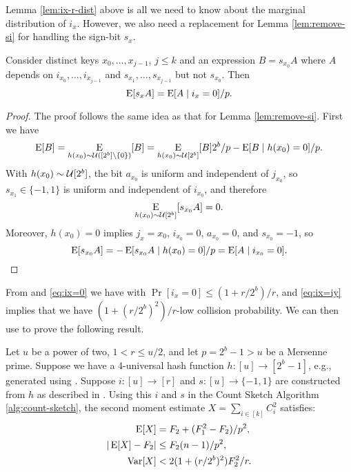 Lemma \ref{lem:ix-r-dist} above is all we need to know about the
marginal distribution of $i_x$. However, we also need a replacement
for Lemma \ref{lem:remove-si} for handling the sign-bit $s_x$.
\begin{lemma}\label{lem:remove-si-r-dist} Consider distinct keys
   $x_0,\ldots,x_{j - 1}$, $j\leq k$ and an expression $B=s_{x_0}A$ where $A$
   depends on $i_{x_0},\ldots,i_{x_{j - 1}}$ and $s_{x_1},\ldots,s_{x_{j - 1}}$ but not
   $s_{x_0}$. 
   Then
   \begin{equation}\label{eq:remove-si-r-dist}
      \operatorname*{E}[s_xA]=\operatorname*{E}[A \mid i_x=0]/p.
   \end{equation}
\end{lemma}
\begin{proof}
   The proof follows the same idea as that for Lemma \ref{lem:remove-si}.
   First we have
   \[\operatorname*{E}[B]=\operatorname*{E}_{h(x_0) \sim \mathcal{U}([2^b]\setminus\{0\})}[B]=\operatorname*{E}_{h(x_0) \sim \mathcal{U}[2^b]}[B]2^b/p-\operatorname*{E}[B \mid h(x_0)=0]/p.\]
   With $h(x_0)\sim \mathcal{U}[2^b]$, the bit $a_{x_0}$ is uniform and 
   independent of $j_{x_0}$, so $s_{x_1}\in\{-1,1\}$ is uniform and 
   independent of $i_{x_0}$, and therefore 
   \[\operatorname*{E}_{h(x_0) \sim \mathcal{U}[2^b]}[s_{x_0}A]=0.\]
   Moreover, $h(x_0)=0$ implies $j_x={x_0}$, $i_{x_0}=0$, $a_{x_0}=0$,
   and $s_{x_0}=-1$,
   so 
   \[\operatorname*{E}[s_{x_0}A]=-\operatorname*{E}[s_{x_0}A \mid h(x_0)=0]/p=\operatorname*{E}[A \mid i_{x_0}=0].\]
\end{proof}

From  and \eqref{eq:ix=0} we have 
with $\Pr[i_x = 0] \le (1 + r/2^b)/r$, and \eqref{eq:ix=iy} implies that we have
$(1 + (r/2^b)^2)/r$-low collision probability. We can then use
 to prove the following result.
\begin{theorem}\label{thm:h-and-s-p-arb-r}
   Let $u$ be a power of two, $1 < r \le u/2$, and let $p=2^b-1>u$ be a
   Mersenne prime.
   Suppose we have a 4-universal hash function $h:[u]\to[2^b-1]$, e.g.,
   generated using . Suppose
   $i:[u]\to[r]$ and
   $s:[u]\to\{-1,1\}$ are constructed from $h$ as described in
   . Using this $i$ and $s$ 
   in the Count Sketch Algorithm \ref{alg:count-sketch}, the second moment 
   estimate $X=\sum_{i\in[k]} C_i^2$ satisfies:
   \begin{align}
      \operatorname*{E}[X] &= F_2+(F_1^2-F_2)/p^2, \label{eq:E-F2-p-arb-r}\\
      | \operatorname*{E}[X] - F_2 | &\le F_2 (n - 1)/p^2, \label{eq:E-F2-p-com-arb-r}\\
      \operatorname*{Var}[X]&< 2(1 + (r/2^b)^2)F_2^2/r.\label{eq:V-F2-p-arb-r}
   \end{align}
\end{theorem}

